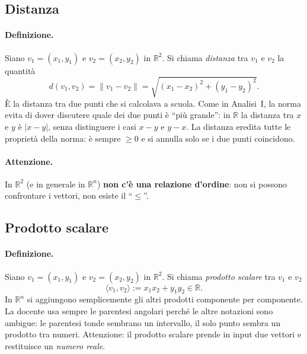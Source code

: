 \subsection{Distanza}

\paragraph{Definizione.} Siano $v_1=(x_1,y_1)$ e $v_2=(x_2,y_2)$ in $\mathbb{R}^2$. Si chiama \emph{distanza} tra $v_1$ e $v_2$ la quantità
\[
  d(v_1,v_2)=\|v_1-v_2\|=\sqrt{(x_1-x_2)^2+(y_1-y_2)^2}.
\]
È la distanza tra due punti che si calcolava a scuola.
Come in Analisi~I, la norma evita di dover discutere quale dei due punti è ``più grande'': in $\mathbb{R}$ la distanza tra $x$ e $y$ è $|x-y|$, senza distinguere i casi $x-y$ e $y-x$. La distanza eredita tutte le proprietà della norma: è sempre $\geq 0$ e si annulla solo se i due punti coincidono.

\paragraph{Attenzione.} In $\mathbb{R}^2$ (e in generale in $\mathbb{R}^n$) \textbf{non c'è una relazione d'ordine}: non si possono confrontare i vettori, non esiste il ``$\leq$''.

\subsection{Prodotto scalare}

\paragraph{Definizione.} Siano $v_1=(x_1,y_1)$ e $v_2=(x_2,y_2)$ in $\mathbb{R}^2$. Si chiama \emph{prodotto scalare} tra $v_1$ e $v_2$
\[
  \langle v_1,v_2\rangle := x_1x_2+y_1y_2\in\mathbb{R}.
\]
In $\mathbb{R}^n$ si aggiungono semplicemente gli altri prodotti componente per componente.
La docente usa sempre le parentesi angolari perché le altre notazioni sono ambigue: le parentesi tonde sembrano un intervallo, il solo punto sembra un prodotto tra numeri.
Attenzione: il prodotto scalare prende in input due vettori e restituisce un \emph{numero reale}.

